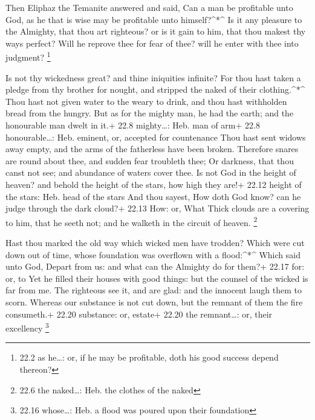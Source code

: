  Then Eliphaz the Temanite answered and said, 
Can a man be profitable unto God, as he that is wise may be profitable
unto himself?\^{}*\^{}  Is it any pleasure to the Almighty,
that thou art righteous? or is it gain to him, that thou makest thy ways
perfect?  Will he reprove thee for fear of thee? will he
enter with thee into judgment? \footnote{22.2 as he\ldots: or, if he may
  be profitable, doth his good success depend thereon?}

 Is not thy wickedness great? and thine iniquities infinite?
 For thou hast taken a pledge from thy brother for nought,
and stripped the naked of their clothing.\^{}*\^{}  Thou
hast not given water to the weary to drink, and thou hast withholden
bread from the hungry.  But as for the mighty man, he had
the earth; and the honourable man dwelt in it.+ 22.8 mighty\ldots: Heb.
man of arm+ 22.8 honourable\ldots: Heb. eminent, or, accepted for
countenance  Thou hast sent widows away empty, and the arms
of the fatherless have been broken.  Therefore snares are
round about thee, and sudden fear troubleth thee;  Or
darkness, that thou canst not see; and abundance of waters cover thee.
 Is not God in the height of heaven? and behold the height
of the stars, how high they are!+ 22.12 height of the stars: Heb. head
of the stars  And thou sayest, How doth God know? can he
judge through the dark cloud?+ 22.13 How: or, What  Thick
clouds are a covering to him, that he seeth not; and he walketh in the
circuit of heaven. \footnote{22.6 the naked\ldots: Heb. the clothes of
  the naked}

 Hast thou marked the old way which wicked men have
trodden?  Which were cut down out of time, whose foundation
was overflown with a flood:\^{}*\^{}  Which said unto God,
Depart from us: and what can the Almighty do for them?+ 22.17 for: or,
to  Yet he filled their houses with good things: but the
counsel of the wicked is far from me.  The righteous see
it, and are glad: and the innocent laugh them to scorn. 
Whereas our substance is not cut down, but the remnant of them the fire
consumeth.+ 22.20 substance: or, estate+ 22.20 the remnant\ldots: or,
their excellency \footnote{22.16 whose\ldots: Heb. a flood was poured
  upon their foundation}

